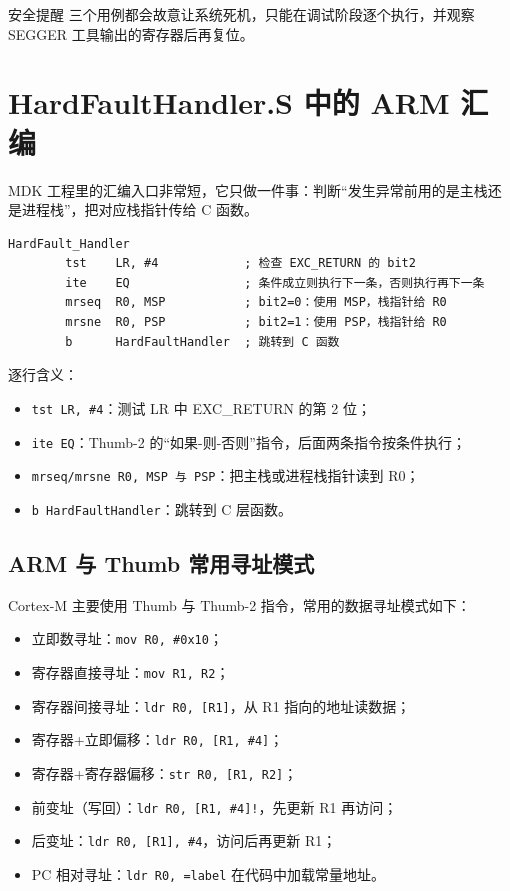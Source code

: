\begin{anybox}{安全提醒}
三个用例都会故意让系统死机，只能在调试阶段逐个执行，并观察 SEGGER 工具输出的寄存器后再复位。
\end{anybox}

\section{HardFaultHandler.S 中的 ARM 汇编}

MDK 工程里的汇编入口非常短，它只做一件事：判断“发生异常前用的是主栈还是进程栈”，把对应栈指针传给 C 函数。

\begin{lstlisting}
HardFault_Handler
        tst    LR, #4            ; 检查 EXC_RETURN 的 bit2
        ite    EQ                ; 条件成立则执行下一条，否则执行再下一条
        mrseq  R0, MSP           ; bit2=0：使用 MSP，栈指针给 R0
        mrsne  R0, PSP           ; bit2=1：使用 PSP，栈指针给 R0
        b      HardFaultHandler  ; 跳转到 C 函数
\end{lstlisting}

逐行含义：

\begin{itemize}
\item \texttt{tst LR, \#4}：测试 LR 中 EXC\_RETURN 的第 2 位；
\item \texttt{ite EQ}：Thumb-2 的“如果-则-否则”指令，后面两条指令按条件执行；
\item \texttt{mrseq/mrsne R0, MSP 与 PSP}：把主栈或进程栈指针读到 R0；
\item \texttt{b HardFaultHandler}：跳转到 C 层函数。
\end{itemize}

\subsection{ARM 与 Thumb 常用寻址模式}

Cortex-M 主要使用 Thumb 与 Thumb-2 指令，常用的数据寻址模式如下：

\begin{itemize}
\item 立即数寻址：\texttt{mov R0, \#0x10}；
\item 寄存器直接寻址：\texttt{mov R1, R2}；
\item 寄存器间接寻址：\texttt{ldr R0, [R1]}，从 R1 指向的地址读数据；
\item 寄存器+立即偏移：\texttt{ldr R0, [R1, \#4]}；
\item 寄存器+寄存器偏移：\texttt{str R0, [R1, R2]}；
\item 前变址（写回）：\texttt{ldr R0, [R1, \#4]!}，先更新 R1 再访问；
\item 后变址：\texttt{ldr R0, [R1], \#4}，访问后再更新 R1；
\item PC 相对寻址：\texttt{ldr R0, =label} 在代码中加载常量地址。
\end{itemize}

